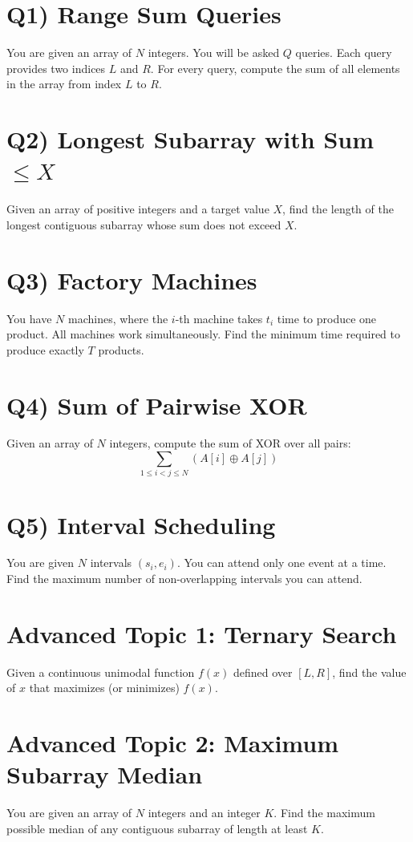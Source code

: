 \documentclass{article}
\begin{document}
\section*{Q1) Range Sum Queries}

You are given an array of $N$ integers. You will be asked $Q$ queries. Each query provides two indices $L$ and $R$. For every query, compute the sum of all elements in the array from index $L$ to $R$.

\section*{Q2) Longest Subarray with Sum $\leq X$}

Given an array of positive integers and a target value $X$, find the length of the longest contiguous subarray whose sum does not exceed $X$.

\section*{Q3) Factory Machines}

You have $N$ machines, where the $i$-th machine takes $t_i$ time to produce one product. All machines work simultaneously. Find the minimum time required to produce exactly $T$ products.

\section*{Q4) Sum of Pairwise XOR}

Given an array of $N$ integers, compute the sum of XOR over all pairs:
\[
\sum_{1 \le i < j \le N} (A[i] \oplus A[j])
\]

\section*{Q5) Interval Scheduling}

You are given $N$ intervals $(s_i, e_i)$. You can attend only one event at a time. Find the maximum number of non-overlapping intervals you can attend.

\section*{Advanced Topic 1: Ternary Search}

Given a continuous unimodal function $f(x)$ defined over $[L, R]$, find the value of $x$ that maximizes (or minimizes) $f(x)$.

\section*{Advanced Topic 2: Maximum Subarray Median}

You are given an array of $N$ integers and an integer $K$. Find the maximum possible median of any contiguous subarray of length at least $K$.
\end{document}

